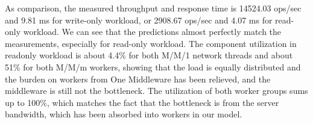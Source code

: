 \begin{table}[!ht]
\caption{\label{tab:qn_2mw}Results of Network of Queues for Two Middlewares}
\end{table}

As comparison, the measured throughput and response time is 14524.03 ops/sec and 9.81 ms for write-only workload, or 2908.67 ops/sec and 4.07 ms for read-only workload. We can see that the predictions almost perfectly match the measurements, especially for read-only workload. The component utilization in readonly workload is about 4.4\% for both M/M/1 network threads and about 51\% for both M/M/m workers, showing that the load is equally distributed and the burden on workers from One Middleware has been relieved, and the middleware is still not the bottleneck. The utilization of both worker groups sums up to 100\%, which matches the fact that the bottleneck is from the server bandwidth, which has been absorbed into workers in our model.


